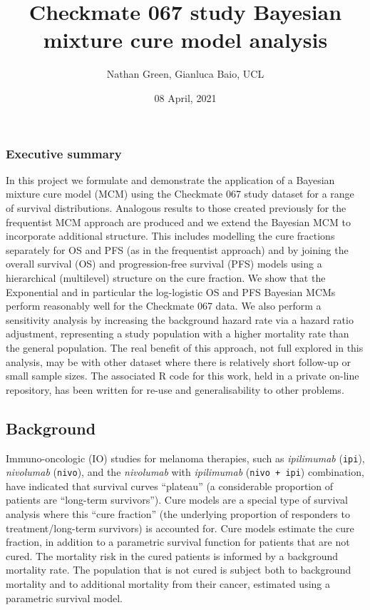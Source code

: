 \documentclass[
]{article}
\title{Checkmate 067 study Bayesian mixture cure model analysis}
\author{Nathan Green, Gianluca Baio, UCL}
\date{08 April, 2021}
\begin{document}
\maketitle

\hypertarget{executive-summary}{%
\subsubsection{Executive summary}\label{executive-summary}}

In this project we formulate and demonstrate the application of a
Bayesian mixture cure model (MCM) using the Checkmate 067 study dataset
for a range of survival distributions. Analogous results to those
created previously for the frequentist MCM approach are produced and we
extend the Bayesian MCM to incorporate additional structure. This
includes modelling the cure fractions separately for OS and PFS (as in
the frequentist approach) and by joining the overall survival (OS) and
progression-free survival (PFS) models using a hierarchical (multilevel)
structure on the cure fraction. We show that the Exponential and in
particular the log-logistic OS and PFS Bayesian MCMs perform reasonably
well for the Checkmate 067 data. We also perform a sensitivity analysis
by increasing the background hazard rate via a hazard ratio adjustment,
representing a study population with a higher mortality rate than the
general population. The real benefit of this approach, not full explored
in this analysis, may be with other dataset where there is relatively
short follow-up or small sample sizes. The associated R code for this
work, held in a private on-line repository, has been written for re-use
and generalisability to other problems.

\hypertarget{background}{%
\subsection{Background}\label{background}}

Immuno-oncologic (IO) studies for melanoma therapies, such as
\emph{ipilimumab} (\texttt{ipi}), \emph{nivolumab} (\texttt{nivo}), and
the \emph{nivolumab} with \emph{ipilimumab} (\texttt{nivo\ +\ ipi})
combination, have indicated that survival curves ``plateau'' (a
considerable proportion of patients are ``long-term survivors''). Cure
models are a special type of survival analysis where this ``cure
fraction'' (the underlying proportion of responders to
treatment/long-term survivors) is accounted for. Cure models estimate
the cure fraction, in addition to a parametric survival function for
patients that are not cured. The mortality risk in the cured patients is
informed by a background mortality rate. The population that is not
cured is subject both to background mortality and to additional
mortality from their cancer, estimated using a parametric survival
model.
\end{document}
